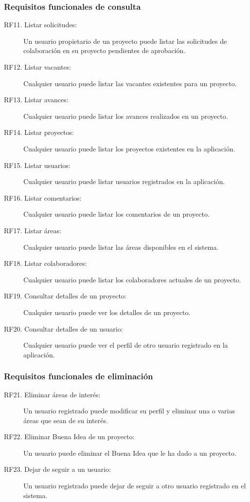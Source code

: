\subsubsection{Requisitos funcionales de consulta}
\begin{description}
    \item[RF11. Listar solicitudes:] Un usuario propietario de un proyecto puede listar las solicitudes de colaboración en su proyecto pendientes de aprobación.
    \item[RF12. Listar vacantes:] Cualquier usuario puede listar las vacantes existentes para un proyecto.
    \item[RF13. Listar avances:] Cualquier usuario puede listar los avances realizados en un proyecto.
    \item[RF14. Listar proyectos:] Cualquier usuario puede listar los proyectos existentes en la aplicación.
    \item[RF15. Listar usuarios:] Cualquier usuario puede listar usuarios registrados en la aplicación.
    \item[RF16. Listar comentarios:] Cualquier usuario puede listar los comentarios de un proyecto.
    \item[RF17. Listar áreas:] Cualquier usuario puede listar las áreas disponibles en el sistema.
    \item[RF18. Listar colaboradores:] Cualquier usuario puede listar los colaboradores actuales de un proyecto.
    \item[RF19. Consultar detalles de un proyecto:] Cualquier usuario puede ver los detalles de un proyecto.
    \item[RF20. Consultar detalles de un usuario:] Cualquier usuario puede ver el perfil de otro usuario registrado en la aplicación.
\end{description}

\subsubsection{Requisitos funcionales de eliminación}
\begin{description}
    \item[RF21. Eliminar áreas de interés:] Un usuario registrado puede modificar su perfil y eliminar una o varias áreas que sean de su interés.
    \item[RF22. Eliminar Buena Idea de un proyecto:] Un usuario puede eliminar el Buena Idea que le ha dado a un proyecto.
    \item[RF23. Dejar de seguir a un usuario:] Un usuario registrado puede dejar de seguir a otro usuario registrado en el sistema.
\end{description}

